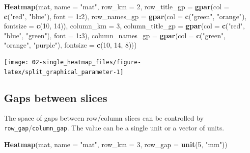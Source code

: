 \documentclass[]{book}
\newenvironment{Shaded}{\begin{snugshade}}{\end{snugshade}}
\newcommand{\KeywordTok}[1]{\textcolor[rgb]{0.13,0.29,0.53}{\textbf{#1}}}
\newcommand{\DataTypeTok}[1]{\textcolor[rgb]{0.13,0.29,0.53}{#1}}
\newcommand{\DecValTok}[1]{\textcolor[rgb]{0.00,0.00,0.81}{#1}}
\newcommand{\StringTok}[1]{\textcolor[rgb]{0.31,0.60,0.02}{#1}}
\newcommand{\OperatorTok}[1]{\textcolor[rgb]{0.81,0.36,0.00}{\textbf{#1}}}
\newcommand{\NormalTok}[1]{#1}
\theoremstyle{definition}
\theoremstyle{definition}
\theoremstyle{definition}
\theoremstyle{remark}
\begin{document}
\begin{Shaded}
\begin{Highlighting}[]
\KeywordTok{Heatmap}\NormalTok{(mat, }\DataTypeTok{name =} \StringTok{"mat"}\NormalTok{, }
    \DataTypeTok{row_km =} \DecValTok{2}\NormalTok{, }\DataTypeTok{row_title_gp =} \KeywordTok{gpar}\NormalTok{(}\DataTypeTok{col =} \KeywordTok{c}\NormalTok{(}\StringTok{"red"}\NormalTok{, }\StringTok{"blue"}\NormalTok{), }\DataTypeTok{font =} \DecValTok{1}\OperatorTok{:}\DecValTok{2}\NormalTok{),}
    \DataTypeTok{row_names_gp =} \KeywordTok{gpar}\NormalTok{(}\DataTypeTok{col =} \KeywordTok{c}\NormalTok{(}\StringTok{"green"}\NormalTok{, }\StringTok{"orange"}\NormalTok{), }\DataTypeTok{fontsize =} \KeywordTok{c}\NormalTok{(}\DecValTok{10}\NormalTok{, }\DecValTok{14}\NormalTok{)),}
    \DataTypeTok{column_km =} \DecValTok{3}\NormalTok{, }\DataTypeTok{column_title_gp =} \KeywordTok{gpar}\NormalTok{(}\DataTypeTok{col =} \KeywordTok{c}\NormalTok{(}\StringTok{"red"}\NormalTok{, }\StringTok{"blue"}\NormalTok{, }\StringTok{"green"}\NormalTok{), }\DataTypeTok{font =} \DecValTok{1}\OperatorTok{:}\DecValTok{3}\NormalTok{),}
    \DataTypeTok{column_names_gp =} \KeywordTok{gpar}\NormalTok{(}\DataTypeTok{col =} \KeywordTok{c}\NormalTok{(}\StringTok{"green"}\NormalTok{, }\StringTok{"orange"}\NormalTok{, }\StringTok{"purple"}\NormalTok{), }\DataTypeTok{fontsize =} \KeywordTok{c}\NormalTok{(}\DecValTok{10}\NormalTok{, }\DecValTok{14}\NormalTok{, }\DecValTok{8}\NormalTok{)))}
\end{Highlighting}
\end{Shaded}

\begin{center}\texttt{[image: 02-single\_heatmap\_files/figure-latex/split\_graphical\_parameter-1]} \end{center}

\subsection{Gaps between slices}\label{gaps-between-slices}

The space of gaps between row/column slices can be controlled by
\texttt{row\_gap}/\texttt{column\_gap}. The value can be a single unit
or a vector of units.

\begin{Shaded}
\begin{Highlighting}[]
\KeywordTok{Heatmap}\NormalTok{(mat, }\DataTypeTok{name =} \StringTok{"mat"}\NormalTok{, }\DataTypeTok{row_km =} \DecValTok{3}\NormalTok{, }\DataTypeTok{row_gap =} \KeywordTok{unit}\NormalTok{(}\DecValTok{5}\NormalTok{, }\StringTok{"mm"}\NormalTok{))}
\end{Highlighting}
\end{Shaded}
\end{document}
